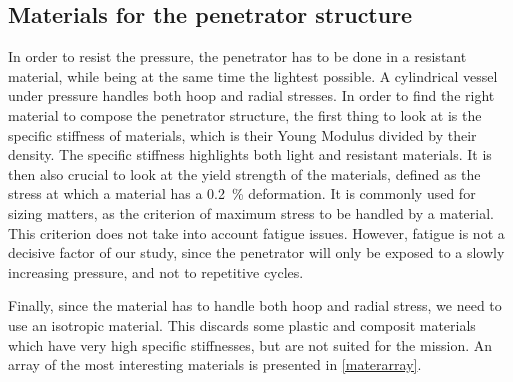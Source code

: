 \subsection{Materials for the penetrator structure}

In order to resist the pressure, the penetrator has to be done in a resistant material, while being at the same time the lightest possible. A cylindrical vessel under pressure handles both hoop and radial stresses. In order to find the right material to compose the penetrator structure, the first thing to look at is the specific stiffness of materials, which is their Young Modulus divided by their density. The specific stiffness highlights both light and resistant materials. It is then also crucial to look at the yield strength of the materials, defined as the stress at which a material has a 0.2~\% deformation. It is commonly used for sizing matters, as the criterion of maximum stress to be handled by a material. This criterion does not take into account fatigue issues. However, fatigue is not a decisive factor of our study, since the penetrator will only be exposed to a slowly increasing pressure, and not to repetitive cycles.

Finally, since the material has to handle both hoop and radial stress, we need to use an isotropic material. This discards some plastic and composit materials which have very high specific stiffnesses, but are not suited for the mission. An array of the most interesting materials is presented in \ref{materarray}.

